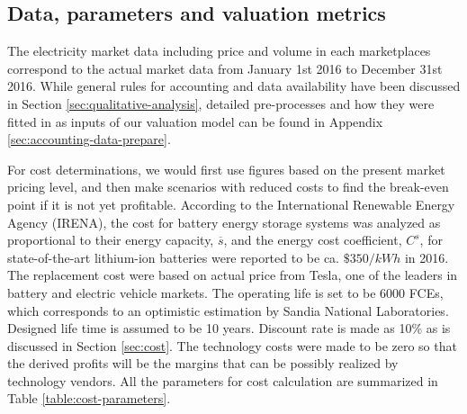 \subsection{Data, parameters and valuation metrics}
The electricity market data including price and volume in each marketplaces correspond to the actual market data from January 1st 2016 to December 31st 2016. While general rules for accounting and data availability have been discussed in Section \ref{sec:qualitative-analysis}, detailed pre-processes and how they were fitted in as inputs of our valuation model can be found in Appendix \ref{sec:accounting-data-prepare}.

For cost determinations, we would first use figures based on the present market pricing level, and then make scenarios with reduced costs to find the break-even point if it is not yet profitable. According to the International Renewable Energy Agency (IRENA)\cite{IRENA2017}, the cost for battery energy storage systems was analyzed as proportional to their energy capacity, $\overline{s}$, and the energy cost coefficient, $C^s$, for state-of-the-art lithium-ion batteries were reported to be ca. $\$350/kWh$ in 2016. The replacement cost were based on actual price from Tesla\cite{Tesla1}, one of the leaders in battery and electric vehicle markets. The operating life is set to be 6000 FCEs, which corresponds to an optimistic estimation by Sandia National Laboratories\cite{Akhil2015}. Designed life time is assumed to be 10 years. Discount rate is made as 10\% as is discussed in Section \ref{sec:cost}. The technology costs were made to be zero so that the derived profits will be the margins that can be possibly realized by technology vendors. All the parameters for cost calculation are summarized in Table \ref{table:cost-parameters}. 

